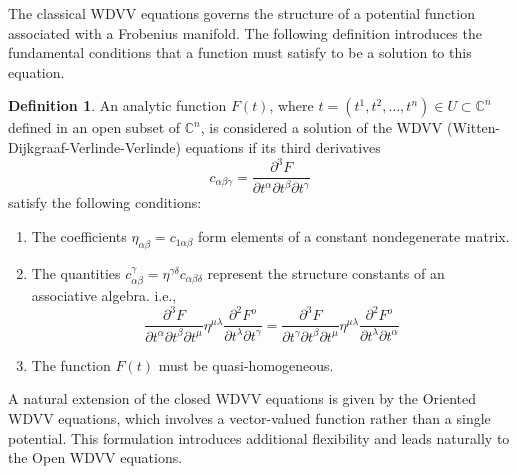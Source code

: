 \documentclass{article}
\theoremstyle{definition}
\newtheorem{definition}{Definition}[section]
\begin{document}
The classical WDVV equations governs the structure of a potential function associated with a Frobenius manifold. The following definition introduces the fundamental conditions that a function must satisfy to be a solution to this equation.

\begin{definition}\cite{B. Dubrovin2}
An analytic function $F(t)$, where $t = (t^1, t^2, \ldots, t^n) \in U \subset \mathbb{C}^n$ defined in an open subset of $\mathbb{C}^n$, is considered a solution of the WDVV (Witten-Dijkgraaf-Verlinde-Verlinde) equations if its third derivatives
\begin{equation*}
c_{\alpha\beta\gamma} = \frac{\partial^3 F}{\partial t^{\alpha} \partial t^{\beta} \partial t^{\gamma}}
\end{equation*}
satisfy the following conditions:

\begin{enumerate}

\item The coefficients $\eta_{\alpha\beta} = c_{1\alpha\beta}$ form elements of a constant nondegenerate matrix.
\item The quantities $c_{\alpha\beta}^{\gamma} = \eta^{\gamma\delta} c_{\alpha\beta\delta}$ represent the structure constants of an associative algebra. i.e.,
\begin{equation}\label{closed WDVV equation}
\frac{\partial^3 F}{\partial t^{\alpha}\partial t^{\beta}\partial t^{\mu}}\eta^{\mu\lambda}\frac{\partial^2 F^o}{\partial t^{\lambda}\partial t^{\gamma}}=\frac{\partial^3 F}{\partial t^{\gamma}\partial t^{\beta}\partial t^{\mu}}\eta^{\mu\lambda}\frac{\partial^2 F^o}{\partial t^{\lambda}\partial t^{\alpha}}
\end{equation}

\item The function $F(t)$ must be quasi-homogeneous.
\end{enumerate}

\end{definition}

A natural extension of the closed WDVV equations is given by the Oriented WDVV equations, which involves a vector-valued function rather than a single potential. This formulation introduces additional flexibility and leads naturally to the Open WDVV equations.
\end{document}
